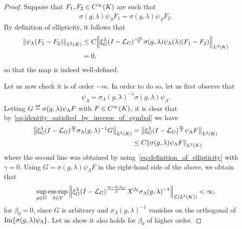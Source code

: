 \begin{proof}
    Suppose that $F_1, F_2 \in \SmoothFunctions \CompactGroup$ are such that
    \begin{align*}
        \sigma(g, \lambda) \psi_\Lambda F_1
        = \sigma(g, \lambda) \psi_\Lambda F_2.
    \end{align*}
    By definition of ellipticity,
    it follows that
    \begin{align*}
        \norm [\Lebesgue 2 \CompactGroup] {\psi_\Lambda (F_1 - F_2)}
        &\leq C
        \norm [\Lebesgue 2 \CompactGroup] {\Rep \lambda \BesselPotential {-m} \sigma(g, \lambda) \psi_\Lambda(\lambda) (F_1 - F_2)}\\
        &= 0,
    \end{align*}
    so that the map is indeed well-defined.

    Let us now check it is of order $-m$.
    In order to do so,
    let us first observe that
    \begin{align}
        \psi_\Lambda = \sigma_\Lambda(g, \lambda)^{-1} \sigma(g, \lambda) \psi_\Lambda.
        \label{eq:identity_satisfied_by_inverse_of_symbol}
    \end{align}
    Letting $G \defeq \sigma(g, \lambda) \psi_\Lambda F$ with $F \in \SmoothFunctions \CompactGroup$,
    it is clear that by~\eqref{eq:identity_satisfied_by_inverse_of_symbol} we have
    \begin{align*}
        \norm [\Lebesgue 2 \CompactGroup] {\Rep \lambda \BesselPotential m \sigma_\Lambda(g, \lambda)^{-1} G}
        &=
        \norm [\Lebesgue 2 \CompactGroup] {\Rep \lambda \BesselPotential m \psi_\Lambda F}\\
        &\leq C
        \norm [\Lebesgue 2 \CompactGroup] {\sigma(g, \lambda) \psi_\Lambda F}\\
    \end{align*}
    where the second line was obtained
    by using~\eqref{eq:definition_of_ellipticity} with $\gamma = 0$.
    Using $G = \sigma(g, \lambda) \psi_\Lambda F$ in the right-hand side of the above,
    we obtain that
    \begin{align*}
        \sup_{g \in \Group}
        \esssup_{\lambda \in \VectorSpace}
        \norm [\Lin {\Lebesgue 2 \CompactGroup}] {\Rep \lambda \BesselPotential {m - \delta \abs {\beta_0}} \LeftDifferentialOperator {\beta_0} \sigma_\Lambda(g, \lambda)^{-1}}
        < \infty,
    \end{align*}
    for $\beta_0 = 0$,
    since $G$ is arbitrary and $\sigma_\Lambda(g, \lambda)^{-1}$ vanishes on the orthogonal of $\Image \{\sigma(g, \lambda) \psi_\Lambda\}$.
    Let us show it also holds for $\beta_0$ of higher order.


\end{proof}
